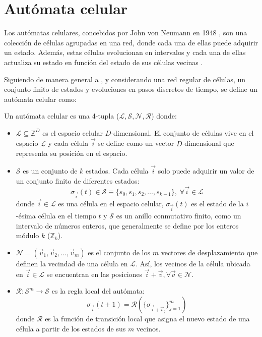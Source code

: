 \section{Autómata celular}

Los autómatas celulares, concebidos por John von Neumann en 1948 \cite{damerow2010_neumann}, son una colección de células agrupadas en una red, donde cada una de ellas puede adquirir un estado. Además, estas células evolucionan en intervalos y cada una de ellas actualiza su estado en función del estado de sus células vecinas \cite{weisstein2002_ca, wolfram1982_ca, fsancho2016_ca}. 

Siguiendo de manera general a \cite{bhattacharjee2019_ca, sayama2024_ca, Ilachinski2001_ca}, y considerando una red regular de células, un conjunto finito de estados y evoluciones en pasos discretos de tiempo, se define un autómata celular como:

\begin{definition}
	Un autómata celular es una 4-tupla ($\mathcal{L}, \mathcal{S}, \mathcal{N}, \mathcal{R}$) donde:
	\begin{itemize}
		\item $\mathcal{L} \subseteq \mathbb{Z}^D$ es el espacio celular $D$-dimensional. El conjunto de células vive en el espacio $\mathcal{L}$ y cada célula $\vec{i}$ se define como un vector $D$-dimensional que representa su posición en el espacio.
		
		\item $\mathcal{S}$ es un conjunto de $k$ estados. Cada célula $\vec{i}$ solo puede adquirir un valor de un conjunto finito de diferentes estados:	
		\[
		\sigma_{\vec{i}}(t) \in \mathcal{S} \equiv \{ s_0, s_1,s_2, \dots, s_{k - 1} \},\; \forall \vec{i} \in \mathcal{L}
		\]
		donde $\vec{i} \in \mathcal{L}$ es una célula en el espacio celular, $\sigma_{\vec{i}} (t)$ es el estado de la $i$-ésima célula en el tiempo $t$ y $\mathcal{S}$ es un anillo conmutativo finito, como un intervalo de números enteros, que generalmente se define por los enteros módulo $k$ ($\mathbb{Z}_k$).
			
		\item $\mathcal{N} = (\vec{v}_1, \vec{v}_2, \dots, \vec{v}_m )$ es el conjunto de los $m$ vectores de desplazamiento que definen la vecindad de una célula en $\mathcal{L}$. Así, los vecinos de la célula ubicada en $\vec{i} \in \mathcal{L}$ se encuentran en las posiciones $\vec{i} + \vec{v}, \forall \vec{v} \in \mathcal{N}$.

		\item $\mathcal{R} : \mathcal{S}^m \to \mathcal{S}$ es la regla local del autómata:
		\[
		\sigma_{\vec{i}}(t + 1) = \mathcal{R} ( \{ \sigma_{\vec{i} + \vec{v}_j}\}_{j = 1}^m  )
		\]
		donde $\mathcal{R}$ es la función de transición local que asigna el nuevo estado de una célula a partir de los estados de sus $m$ vecinos.		
	\end{itemize}
	
\end{definition}

